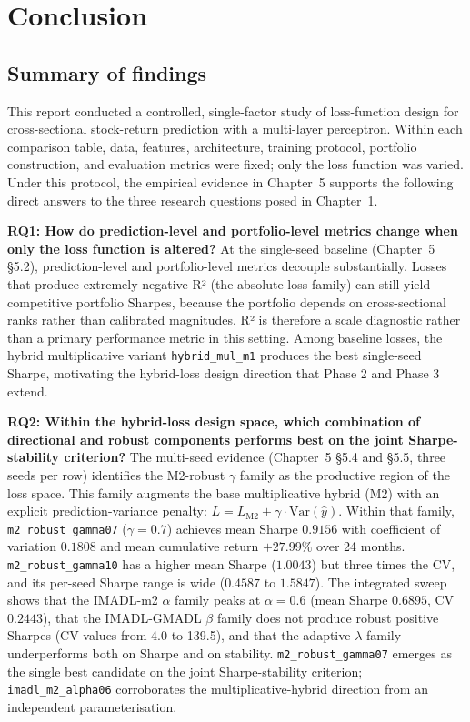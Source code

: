 \chapter{Conclusion}

\label{ch:conclusion}

\section{Summary of findings}

\label{sec:summary-of-findings}

This report conducted a controlled, single-factor study of loss-function design for cross-sectional stock-return prediction with a multi-layer perceptron. Within each comparison table, data, features, architecture, training protocol, portfolio construction, and evaluation metrics were fixed; only the loss function was varied. Under this protocol, the empirical evidence in Chapter~5 supports the following direct answers to the three research questions posed in Chapter~1.

\textbf{RQ1: How do prediction-level and portfolio-level metrics change when only the loss function is altered?} At the single-seed baseline (Chapter~5 \S5.2), prediction-level and portfolio-level metrics decouple substantially. Losses that produce extremely negative R² (the absolute-loss family) can still yield competitive portfolio Sharpes, because the portfolio depends on cross-sectional ranks rather than calibrated magnitudes. R² is therefore a scale diagnostic rather than a primary performance metric in this setting. Among baseline losses, the hybrid multiplicative variant \texttt{hybrid\_mul\_m1} produces the best single-seed Sharpe, motivating the hybrid-loss design direction that Phase 2 and Phase 3 extend.

\textbf{RQ2: Within the hybrid-loss design space, which combination of directional and robust components performs best on the joint Sharpe-stability criterion?} The multi-seed evidence (Chapter~5 \S5.4 and \S5.5, three seeds per row) identifies the M2-robust $\gamma$ family as the productive region of the loss space. This family augments the base multiplicative hybrid (M2) with an explicit prediction-variance penalty: $L = L_{\mathrm{M2}} + \gamma \cdot \mathrm{Var}(\hat y)$. Within that family, \texttt{m2\_robust\_gamma07} ($\gamma = 0.7$) achieves mean Sharpe $0.9156$ with coefficient of variation $0.1808$ and mean cumulative return $+27.99\%$ over 24 months. \texttt{m2\_robust\_gamma10} has a higher mean Sharpe ($1.0043$) but three times the CV, and its per-seed Sharpe range is wide ($0.4587$ to $1.5847$). The integrated sweep shows that the IMADL-m2 $\alpha$ family peaks at $\alpha = 0.6$ (mean Sharpe $0.6895$, CV $0.2443$), that the IMADL-GMADL $\beta$ family does not produce robust positive Sharpes (CV values from 4.0 to 139.5), and that the adaptive-$\lambda$ family underperforms both on Sharpe and on stability. \texttt{m2\_robust\_gamma07} emerges as the single best candidate on the joint Sharpe-stability criterion; \texttt{imadl\_m2\_alpha06} corroborates the multiplicative-hybrid direction from an independent parameterisation.

